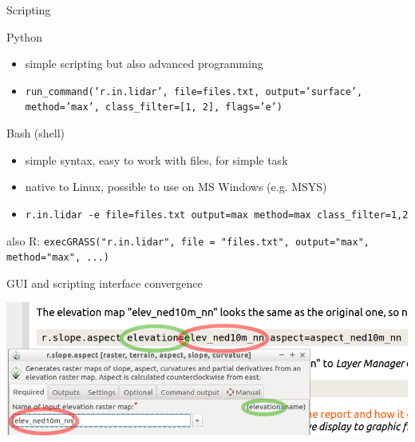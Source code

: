 \documentclass[xcolor={dvipsnames,usenames},beamer,aspectratio=169]{beamer}
\begin{document}
\begin{frame}{Scripting}

\begin{block}{Python}
 \begin{itemize}
  \item simple scripting but also advanced programming
  \item \texttt{run\_command('r.in.lidar', file=files.txt, output='surface', method='max', class\_filter=[1, 2], flags='e')}
 \end{itemize}
\end{block}

\begin{block}{Bash (shell)}
 \begin{itemize}
  \item simple syntax, easy to work with files, for simple task
  \item native to Linux, possible to use on MS Windows (e.g. MSYS)
  \item \texttt{r.in.lidar -e file=files.txt output=max method=max class\_filter=1,2}
 \end{itemize}
\end{block}

\begin{small}
also R: \texttt{execGRASS("r.in.lidar", file = "files.txt", output="max", method="max", ...)}
\end{small}

\end{frame}

\begin{frame}{GUI and scripting interface convergence}

\centering
\includegraphics[width=\textwidth]{grass/grass_cmd_gui}%

\end{frame}
\end{document}

